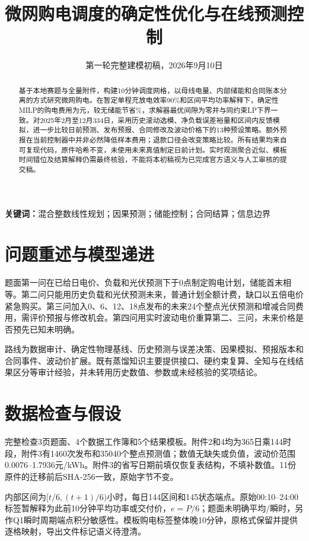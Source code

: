 \documentclass[UTF8,11pt,a4paper]{ctexart}
\title{微网购电调度的确定性优化与在线预测控制}
\author{}\date{第一轮完整建模初稿，2026年9月10日}
\begin{document}
\pagestyle{plain}\maketitle
\begin{abstract}
基于本地赛题与全量附件，构建10分钟调度网格，以母线电量、内部储能和合同账本分离的方式研究微网购电。在暂定单程充放电效率90\%和区间平均功率解释下，确定性MILP的购电费用为\QOneCost 元，较无储能节省\Saving\%，求解器最优间隙为零并与同约束LP下界一致。对2025年2月至12月334日，采用历史滚动选模、净负载误差裕量和区间内反馈模拟，进一步比较日前预测、发布预报、合同修改及波动价格下的13种预设策略。额外预报在当前控制器中并非必然降低样本费用；退款口径会改变策略比较。所有结果均来自可复现代码，原件哈希不变，未使用未来真值制定日前计划。实时观测聚合近似、模板时间错位及结算解释仍需最终核验，不能将本初稿视为已完成官方语义与人工审核的提交稿。
\end{abstract}
\noindent\textbf{关键词：}混合整数线性规划；因果预测；储能控制；合同结算；信息边界
\clearpage

\section{问题重述与模型递进}
题面\cite{problem}第一问在已给日电价、负载和光伏预测下于0点制定购电计划，储能首末相等。第二问只能用历史负载和光伏预测未来，普通计划全额计费，缺口以五倍电价紧急购买。第三问加入0、6、12、18点发布的未来24个整点光伏预测和增减合同费用，需评价预报与修改机会。第四问用实时波动电价重算第二、三问，未来价格是否预先已知未明确。

路线为数据审计、确定性物理基线、历史预测与误差决策、因果模拟、预报版本和合同事件、波动价扩展。既有蒸馏知识主要提供接口、硬约束复算、全知与在线结果区分等审计经验，并未转用历史数值、参数或未经核验的奖项结论。

\section{数据检查与假设}
完整检查3页题面、4个数据工作簿和5个结果模板。附件2和4均为365日乘144时段，附件3有1460次发布和35040个整点预测值；数值无缺失或负值，波动价范围0.0076--1.7936元/kWh。附件3的省写日期前填仅恢复表结构，不填补数值。11份原件的迁移前后SHA-256一致，原始字节不变。

内部区间为$[t/6,(t+1)/6)$小时，每日144区间和145状态端点。原始00:10--24:00标签暂解释为此前10分钟平均功率或交付价，$e=P/6$；题面未明确平均/瞬时，另作Q1瞬时周期端点积分敏感性。模板购电标签整体晚10分钟，原格式保留并提供逐格映射，导出文件标记语义待澄清。
\end{document}
